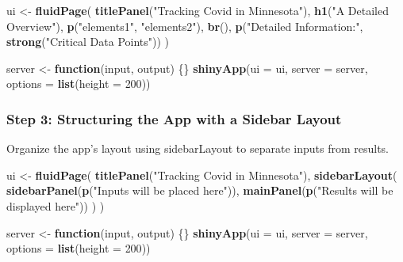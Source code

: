 \documentclass[
]{book}
\newenvironment{Shaded}{\begin{snugshade}}{\end{snugshade}}
\newcommand{\AttributeTok}[1]{\textcolor[rgb]{0.13,0.29,0.53}{#1}}
\newcommand{\ControlFlowTok}[1]{\textcolor[rgb]{0.13,0.29,0.53}{\textbf{#1}}}
\newcommand{\DecValTok}[1]{\textcolor[rgb]{0.00,0.00,0.81}{#1}}
\newcommand{\FunctionTok}[1]{\textcolor[rgb]{0.13,0.29,0.53}{\textbf{#1}}}
\newcommand{\NormalTok}[1]{#1}
\newcommand{\OtherTok}[1]{\textcolor[rgb]{0.56,0.35,0.01}{#1}}
\newcommand{\StringTok}[1]{\textcolor[rgb]{0.31,0.60,0.02}{#1}}
\begin{document}
\begin{Shaded}
\begin{Highlighting}[]
\NormalTok{ui }\OtherTok{\textless{}{-}} \FunctionTok{fluidPage}\NormalTok{(}
  \FunctionTok{titlePanel}\NormalTok{(}\StringTok{"Tracking Covid in Minnesota"}\NormalTok{),}
  \FunctionTok{h1}\NormalTok{(}\StringTok{"A Detailed Overview"}\NormalTok{),}
  \FunctionTok{p}\NormalTok{(}\StringTok{"elements1"}\NormalTok{, }\StringTok{"elements2"}\NormalTok{),}
  \FunctionTok{br}\NormalTok{(),}
  \FunctionTok{p}\NormalTok{(}\StringTok{"Detailed Information:"}\NormalTok{, }\FunctionTok{strong}\NormalTok{(}\StringTok{"Critical Data Points"}\NormalTok{))}
\NormalTok{)}

\NormalTok{server }\OtherTok{\textless{}{-}} \ControlFlowTok{function}\NormalTok{(input, output) \{\}}
\FunctionTok{shinyApp}\NormalTok{(}\AttributeTok{ui =}\NormalTok{ ui, }\AttributeTok{server =}\NormalTok{ server, }\AttributeTok{options =} \FunctionTok{list}\NormalTok{(}\AttributeTok{height =} \DecValTok{200}\NormalTok{))}
\end{Highlighting}
\end{Shaded}

\hypertarget{step-3-structuring-the-app-with-a-sidebar-layout}{%
\subsubsection{Step 3: Structuring the App with a Sidebar Layout}\label{step-3-structuring-the-app-with-a-sidebar-layout}}

Organize the app's layout using sidebarLayout to separate inputs from results.

\begin{Shaded}
\begin{Highlighting}[]
\NormalTok{ui }\OtherTok{\textless{}{-}} \FunctionTok{fluidPage}\NormalTok{(}
  \FunctionTok{titlePanel}\NormalTok{(}\StringTok{"Tracking Covid in Minnesota"}\NormalTok{),}
  \FunctionTok{sidebarLayout}\NormalTok{(}
    \FunctionTok{sidebarPanel}\NormalTok{(}\FunctionTok{p}\NormalTok{(}\StringTok{"Inputs will be placed here"}\NormalTok{)),}
    \FunctionTok{mainPanel}\NormalTok{(}\FunctionTok{p}\NormalTok{(}\StringTok{"Results will be displayed here"}\NormalTok{))}
\NormalTok{  )}
\NormalTok{)}

\NormalTok{server }\OtherTok{\textless{}{-}} \ControlFlowTok{function}\NormalTok{(input, output) \{\}}
\FunctionTok{shinyApp}\NormalTok{(}\AttributeTok{ui =}\NormalTok{ ui, }\AttributeTok{server =}\NormalTok{ server, }\AttributeTok{options =} \FunctionTok{list}\NormalTok{(}\AttributeTok{height =} \DecValTok{200}\NormalTok{))}
\end{Highlighting}
\end{Shaded}
\end{document}
